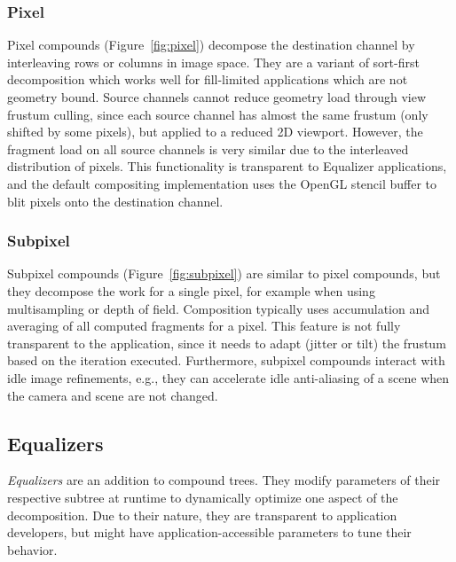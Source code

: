 \documentclass[10pt,journal,compsoc]{IEEEtran}
\newcommand{\FIXME}[1]{\textbf{\color{BLUE}{FIXME: #1}}}
\newcommand{\fig}[1]{Figure~\ref{#1}}
\begin{document}
\subsubsection{Pixel}

Pixel compounds (\fig{fig:pixel}) decompose the destination channel by
interleaving rows or columns in image space. They are a variant of sort-first
decomposition which works well for fill-limited applications which are not
geometry bound. Source channels cannot reduce geometry load through view frustum
culling, since each source channel has almost the same frustum (only shifted by
some pixels), but applied to a reduced 2D viewport. However, the fragment load
on all source channels is very similar due to the interleaved distribution of
pixels. This functionality is transparent to Equalizer applications, and the
default compositing implementation uses the OpenGL stencil buffer to blit pixels
onto the destination channel.

\subsubsection{Subpixel}

Subpixel compounds (\fig{fig:subpixel}) are similar to pixel compounds, but they
decompose the work for a single pixel, for example when using multisampling or
depth of field. Composition typically uses accumulation and averaging of all
computed fragments for a pixel. This feature is not fully transparent to the
application, since it needs to adapt (jitter or tilt) the frustum based on the
iteration executed. Furthermore, subpixel compounds interact with idle image
refinements, e.g., they can accelerate idle anti-aliasing of a scene when the
camera and scene are not changed.

\subsection{Equalizers}

{\em Equalizers} are an addition to compound trees. They modify parameters of their
respective subtree at runtime to dynamically optimize one aspect of the decomposition. Due
to their nature, they are transparent to application developers, but might have
application-accessible parameters to tune their behavior.
\FIXME{ok, this is a bit tricky to Equalizer as a name for the framework as well as for this, can't we resolve this?}
\end{document}
